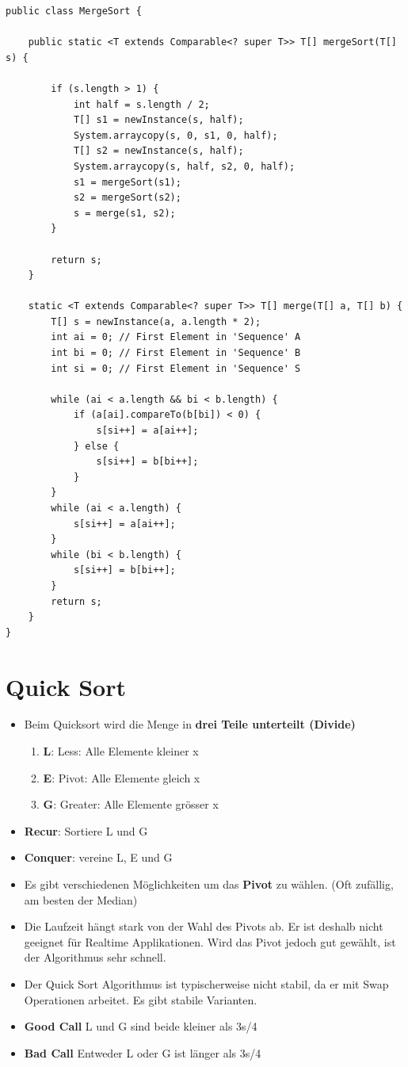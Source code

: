 \begin{lstlisting}[caption=Rekursiver Merge Sort]
public class MergeSort {

	public static <T extends Comparable<? super T>> T[] mergeSort(T[] s) {

		if (s.length > 1) {
			int half = s.length / 2;
			T[] s1 = newInstance(s, half);
			System.arraycopy(s, 0, s1, 0, half);
			T[] s2 = newInstance(s, half);
			System.arraycopy(s, half, s2, 0, half);
			s1 = mergeSort(s1);
			s2 = mergeSort(s2);
			s = merge(s1, s2);
		}

		return s;
	}

	static <T extends Comparable<? super T>> T[] merge(T[] a, T[] b) {
		T[] s = newInstance(a, a.length * 2);
		int ai = 0; // First Element in 'Sequence' A
		int bi = 0; // First Element in 'Sequence' B
		int si = 0; // First Element in 'Sequence' S

		while (ai < a.length && bi < b.length) {
			if (a[ai].compareTo(b[bi]) < 0) {
				s[si++] = a[ai++];
			} else {
				s[si++] = b[bi++];
			}
		}
		while (ai < a.length) {
			s[si++] = a[ai++];
		}
		while (bi < b.length) {
			s[si++] = b[bi++];
		}
		return s;
	}
}
\end{lstlisting}

 \section{Quick Sort}
\begin{itemize}
	\item Beim Quicksort wird die Menge in \textbf{drei Teile unterteilt (Divide)} 
	\begin{enumerate}
		\item \textbf{L}: Less: Alle Elemente kleiner x
		\item \textbf{E}: Pivot: Alle Elemente gleich x
		\item \textbf{G}: Greater: Alle Elemente grösser x
	\end{enumerate}
	\item \textbf{Recur}: Sortiere L und G
	\item \textbf{Conquer}: vereine L, E und G
	\item Es gibt verschiedenen Möglichkeiten um das \textbf{Pivot} zu wählen. (Oft zufällig, am besten der Median)
	\item Die Laufzeit hängt stark von der Wahl des Pivots ab. Er ist deshalb nicht geeignet für Realtime Applikationen. Wird das Pivot jedoch gut gewählt, ist der Algorithmus sehr schnell.
	\item Der Quick Sort Algorithmus ist typischerweise nicht stabil, da er mit Swap Operationen arbeitet. Es gibt stabile Varianten.
	\item \textbf{Good Call} L und G sind beide kleiner als 3s/4 
	\item \textbf{Bad Call} Entweder L oder G ist länger als 3s/4
\end{itemize}

